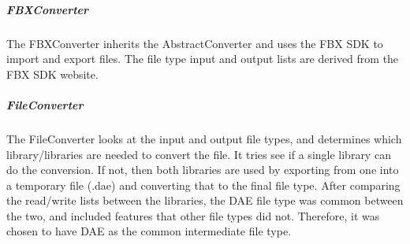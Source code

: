     \subparagraph{FBXConverter}
    \hfill \break
    The FBXConverter inherits the AbstractConverter and uses the FBX SDK to import and export files.
    The file type input and output lists are derived from the FBX SDK website.

    \subparagraph{FileConverter}
    \hfill \break
    The FileConverter looks at the input and output file types, and determines which library/libraries are needed to convert the file.
    It tries see if a single library can do the conversion.  If not, then both libraries are used by exporting from one into a 
    temporary file (.dae) and converting that to the final file type. After comparing the read/write lists between the libraries,
    the DAE file type was common between the two, and included features that other file types did not.  Therefore, it was chosen
    to have DAE as the common intermediate file type.

